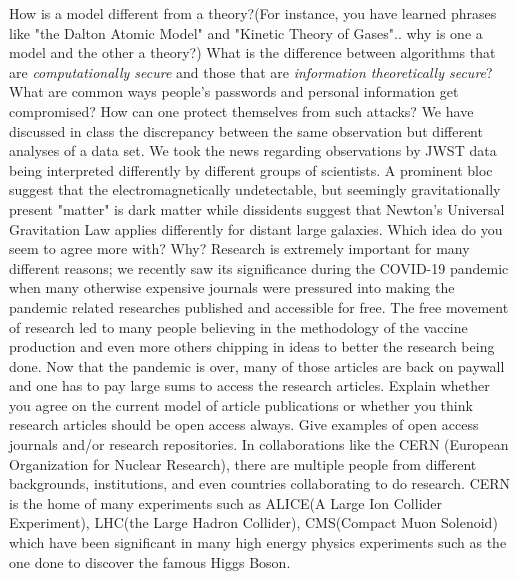 \documentclass[12pt,addpoints]{exam}
\begin{document}
	\begin{questions}
		\question How is a model different from a theory?(For instance, you have learned phrases like "the Dalton Atomic Model" and "Kinetic Theory of Gases".. why is one a model and the other a theory?)\vspace{2in}
		\question What is the difference between algorithms that are \textit{computationally secure} and those that are \textit{information theoretically secure}?\vspace{2in}
		\question What are common ways people's passwords and personal information get compromised? How can one protect themselves from such attacks?\vspace{2in}
		\question We have discussed in class the discrepancy between the same observation but different analyses of a data set. We took the news regarding observations by JWST data being interpreted differently by different groups of scientists. A prominent bloc suggest that the electromagnetically undetectable, but seemingly gravitationally present "matter" is dark matter while dissidents suggest that Newton's Universal Gravitation Law applies differently for distant large galaxies. Which idea do you seem to agree more with? Why? \vspace{2in}
		\question Research is extremely important for many different reasons; we recently saw its significance during the COVID-19 pandemic when many otherwise expensive journals were pressured into making the pandemic related researches published and accessible for free. The free movement of research led to many people believing in the methodology of the vaccine production and even more others chipping in ideas to better the research being done. Now that the pandemic is over, many of those articles are back on paywall and one has to pay large sums to access the research articles. Explain whether you agree on the current model of article publications or whether you think research articles should be open access always. Give examples of open access journals and/or research repositories. \vspace{3in}
		\question In collaborations like the CERN (European Organization for Nuclear Research), there are multiple people from different backgrounds, institutions, and even countries collaborating to do research. CERN is the home of many experiments such as ALICE(A Large Ion Collider Experiment), LHC(the Large Hadron Collider), CMS(Compact Muon Solenoid) which have been significant in many high energy physics experiments such as the one done to discover the famous Higgs Boson.

\end{questions}
\end{document}
